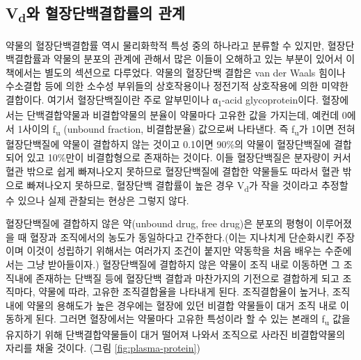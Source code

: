 \documentclass[
  11pt,
  krantz2, a4paper, twoside]{krantz}
\theoremstyle{definition}
\theoremstyle{definition}
\theoremstyle{definition}
\theoremstyle{definition}
\theoremstyle{remark}
\begin{document}
\hypertarget{vduxc640-uxd608uxc7a5uxb2e8uxbc31uxacb0uxd569uxb960uxc758-uxad00uxacc4}{%
\subsection{\texorpdfstring{V\textsubscript{d}와 혈장단백결합률의 관계}{Vd와 혈장단백결합률의 관계}}\label{vduxc640-uxd608uxc7a5uxb2e8uxbc31uxacb0uxd569uxb960uxc758-uxad00uxacc4}}

약물의 혈장단백결합률 역시 물리화학적 특성 중의 하나라고 분류할 수
있지만, 혈장단백결합률과 약물의 분포의 관계에 관해서 많은 이들이
오해하고 있는 부분이 있어서 이 책에서는 별도의 섹션으로 다루었다. 약물의
혈장단백 결합은 van der Waals 힘이나 수소결합 등에 의한 소수성 부위들의
상호작용이나 정전기적 상호작용에 의한 미약한 결합이다. 여기서
혈장단백질이란 주로 알부민이나 α\textsubscript{1}-acid glycoprotein이다. 혈장에서는
단백결합약물과 비결합약물의 분율이 약물마다 고유한 값을 가지는데, 예컨데
0에서 1사이의 f\textsubscript{u} (unbound fraction, 비결합분율) 값으로써 나타낸다. 즉
f\textsubscript{u}가 1이면 전혀 혈장단백질에 약물이 결합하지 않는 것이고 0.1이면 90\%의
약물이 혈장단백질에 결합되어 있고 10\%만이 비결합형으로 존재하는 것이다.
이들 혈장단백질은 분자량이 커서 혈관 밖으로 쉽게 빠져나오지 못하므로
혈장단백질에 결합한 약물들도 따라서 혈관 밖으로 빠져나오지 못하므로,
혈장단백 결합률이 높은 경우 V\textsubscript{d}가 작을 것이라고 추정할 수 있으나 실제
관찰되는 현상은 그렇지 않다.

혈장단백질에 결합하지 않은 약(unbound drug, free drug)은 분포의 평형이
이루어졌을 때 혈장과 조직에서의 농도가 동일하다고 간주한다.(이는
지나치게 단순화시킨 주장이며 이것이 성립하기 위해서는 여러가지 조건이
붙지만 약동학을 처음 배우는 수준에서는 그냥 받아들이자.) 혈장단백질에
결합하지 않은 약물이 조직 내로 이동하면 그 조직내에 존재하는 단백질 등에
혈장단백 결합과 마찬가지의 기전으로 결합하게 되고 조직마다, 약물에 따라,
고유한 조직결합율을 나타내게 된다. 조직결합율이 높거나,
조직 내에 약물의 용해도가 높은 경우에는 혈장에 있던 비결합 약물들이 대거
조직 내로 이동하게 된다. 그러면 혈장에서는 약물마다 고유한 특성이라 할
수 있는 본래의 f\textsubscript{u} 값을 유지하기 위해 단백결합약물들이 대거 떨어져
나와서 조직으로 사라진 비결합약물의 자리를 채울 것이다. (그림 \ref{fig:plasma-protein})
\end{document}
